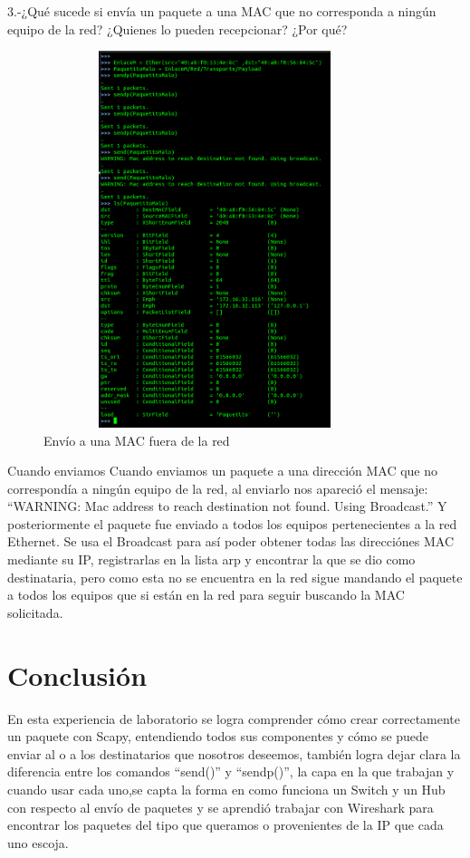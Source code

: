\documentclass{udpreport}
\begin{document}
  	  3.-¿Qué sucede si envía un paquete a una MAC que no corresponda a ningún equipo
  	      de la red? ¿Quienes lo pueden recepcionar? ¿Por qué?\\
    		\begin{figure}[h]
  	        	\centering
  	          	\includegraphics[width=10cm,height=11cm]{EnvioPaquetitoMalo.png}
  	        	\caption{Envío a una MAC fuera de la red}
  	        \end{figure}
 	      Cuando enviamos 
 	      Cuando enviamos un paquete a una dirección MAC que no correspondía a ningún equipo de la red, al enviarlo nos apareció
 	      el mensaje: “WARNING: Mac address to reach destination not found. Using Broadcast.” Y posteriormente el paquete fue
 	      enviado a todos los equipos pertenecientes a la red Ethernet. Se usa el Broadcast para así poder obtener todas las
 	      direcciónes MAC mediante su IP, registrarlas en la lista arp y encontrar la que se dio como destinataria, pero como esta
 	      no se encuentra en la red sigue mandando el paquete a todos los equipos que si están en la red para seguir buscando la
 	      MAC solicitada.\\

 	     
	      

\chapter{Conclusión}
  	      En esta experiencia de laboratorio se logra comprender cómo crear correctamente un paquete con Scapy,
  	      entendiendo todos sus componentes y cómo se puede enviar al o a los destinatarios que nosotros deseemos, también
  	      logra dejar clara la diferencia entre los comandos “send()” y “sendp()”, la capa en la que trabajan y cuando usar cada
  	      uno,se capta la forma en como funciona un Switch y un Hub con respecto al envío de paquetes y se aprendió trabajar con
  	      Wireshark para encontrar los paquetes del tipo que queramos o provenientes de la IP que cada uno  escoja.
\begin{thebibliography}{x}

\end{thebibliography}
\end{document}
